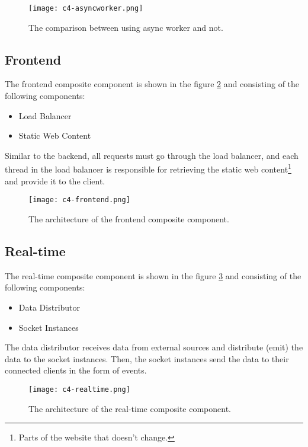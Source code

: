\documentclass[../thesis.tex]{subfiles}
\begin{document}
\begin{figure}[!ht]
	\centering
	\texttt{[image: c4-asyncworker.png]}
	\caption{The comparison between using async worker and not.}
	\label{fig:asyncworker}
\end{figure}

\subsection{Frontend}
\label{sec:frontend}

The frontend composite component is shown in the figure \ref{fig:frontend} and consisting of the following components:
\begin{itemize}
	\item Load Balancer
	\item Static Web Content
\end{itemize}

Similar to the backend, all requests must go through the load balancer, and each thread in the load balancer is responsible for retrieving the static web content\footnote{Parts of the website that doesn't change.} and provide it to the client. 


\begin{figure}[!ht]
	\centering
	\texttt{[image: c4-frontend.png]}
	\caption{The architecture of the frontend composite component.}
	\label{fig:frontend}
\end{figure}


\subsection{Real-time}
\label{sec:realtime}

The real-time composite component is shown in the figure \ref{fig:realtime} and consisting of the following components:

\begin{itemize}
	\item Data Distributor
	\item Socket Instances
\end{itemize}

The data distributor receives data from external sources and distribute (emit) the data to the socket instances. Then, the socket instances send the data to their connected clients in the form of events. 

\begin{figure}[!ht]
	\centering
	\texttt{[image: c4-realtime.png]}
	\caption{The architecture of the real-time composite component.}
	\label{fig:realtime}
\end{figure}
\end{document}
